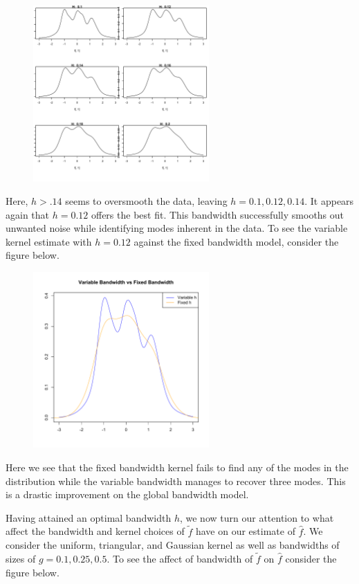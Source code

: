\documentclass[12pt]{article}  %
\begin{document}
\begin{enumerate}
\begin{enumerate}
\begin{figure}[h]
\centering
\includegraphics[width = 0.6\textwidth]{p2.pdf}
\end{figure}

Here, $h>.14$ seems to oversmooth the data, leaving $h = 0.1, 0.12, 0.14$. It appears again that $h = 0.12$ offers the best fit. This bandwidth successfully smooths out unwanted noise while identifying modes inherent in the data. To see the variable kernel estimate with $h = 0.12$ against the fixed bandwidth model, consider the figure below. 

\begin{figure}[h!]
\centering
\includegraphics[width = 0.6\textwidth]{p3.pdf}
\end{figure}

Here we see that the fixed bandwidth kernel fails to find any of the modes in the distribution while the variable bandwidth manages to recover three modes. This is a drastic improvement on the global bandwidth model. 

Having attained an optimal bandwidth $h$, we now turn our attention to what affect the bandwidth and kernel choices of $\widetilde{f}$ have on our estimate of $\widehat{f}$. We consider the uniform, triangular, and Gaussian kernel as well as bandwidths of sizes of $g = 0.1, 0.25, 0.5$. To see the affect of bandwidth of $\widetilde{f}$ on $\widehat{f}$ consider the figure below. 


\end{enumerate}
\end{enumerate}
\end{document}
